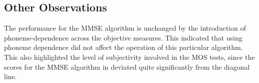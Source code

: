 \subsection{Other Observations}

The performance for the \ac{MMSE} algorithm is unchanged by the introduction
of phoneme-dependence across the objective measures. This indicated
that using phoneme dependence did not affect the operation of this
particular algorithm. This also highlighted the level of subjectivity
involved in the \ac{MOS} tests, since the scores for the \ac{MMSE}
algorithm in 
deviated quite significantly from the diagonal line.
